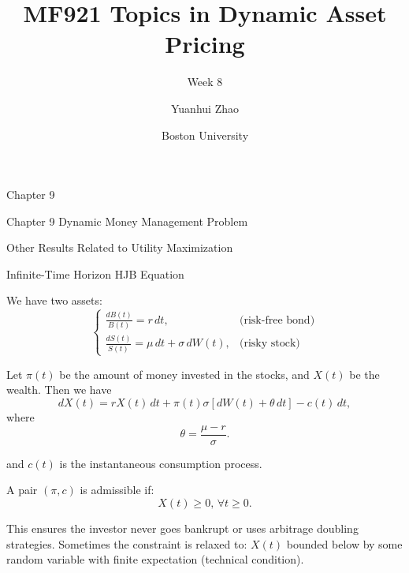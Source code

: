 \documentclass{beamer}
\title{MF921 Topics in Dynamic Asset Pricing}
\subtitle{Week 8}
\author{Yuanhui Zhao}
\date{Boston University}
\begin{document}
\frame{\titlepage}

\begin{frame}{Chapter 9}

    {
    \begin{center}
        Chapter 9 Dynamic Money Management Problem
    \end{center}
    \begin{center}
        Other Results Related to Utility Maximization
    \end{center}
    }
    
\end{frame}

\begin{frame}{Infinite-Time Horizon HJB Equation}


    {\footnotesize \footnotesize
We have two assets:
\[
\begin{cases} 
\frac{dB(t)}{B(t)} = r \, dt, & \text{(risk-free bond)} \\
\frac{dS(t)}{S(t)} = \mu \, dt + \sigma \, dW(t), & \text{(risky stock)}
\end{cases}
\]
\par \pause Let $\pi(t)$ be the amount of money invested in the stocks, and $X(t)$ be the wealth.
Then we have
\[
dX(t) = rX(t)\,dt + \pi(t)\sigma [dW(t) + \theta\,dt] - c(t)\,dt,
\]
where
\[
\theta = \frac{\mu - r}{\sigma}.
\]
\par and $c(t)$ is the instantaneous consumption process.

\par A pair \((\pi, c)\) is admissible if:
\[
X(t) \geq 0, \, \forall t \geq 0.
\]

 \pause This ensures the investor never goes bankrupt or uses arbitrage doubling strategies.
 Sometimes the constraint is relaxed to: \( X(t) \) bounded below by 
 some random variable with finite expectation (technical condition).

    }
    
\end{frame}
\end{document}
